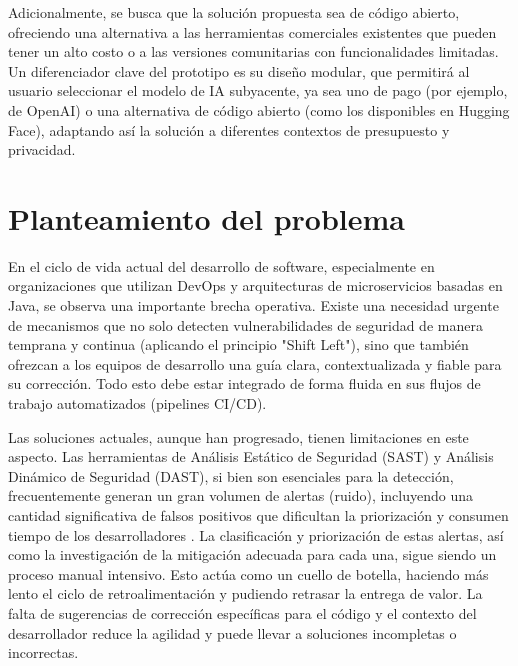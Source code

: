 Adicionalmente, se busca que la solución propuesta sea de código abierto, ofreciendo una alternativa a las herramientas comerciales existentes que pueden tener un alto costo \cite{ghas_docs, sonarqube_editions} o a las versiones comunitarias con funcionalidades limitadas. Un diferenciador clave del prototipo es su diseño modular, que permitirá al usuario seleccionar el modelo de IA subyacente, ya sea uno de pago (por ejemplo, de OpenAI) o una alternativa de código abierto (como los disponibles en Hugging Face), adaptando así la solución a diferentes contextos de presupuesto y privacidad.

\section{Planteamiento del problema}\label{sec:planteamiento_problema}
En el ciclo de vida actual del desarrollo de software, especialmente en organizaciones que utilizan DevOps y arquitecturas de microservicios basadas en Java, se observa una importante brecha operativa. Existe una necesidad urgente de mecanismos que no solo detecten vulnerabilidades de seguridad de manera temprana y continua (aplicando el principio "Shift Left"), sino que también ofrezcan a los equipos de desarrollo una guía clara, contextualizada y fiable para su corrección. Todo esto debe estar integrado de forma fluida en sus flujos de trabajo automatizados (pipelines CI/CD).

Las soluciones actuales, aunque han progresado, tienen limitaciones en este aspecto. Las herramientas de Análisis Estático de Seguridad (SAST) y Análisis Dinámico de Seguridad (DAST), si bien son esenciales para la detección, frecuentemente generan un gran volumen de alertas (ruido), incluyendo una cantidad significativa de falsos positivos que dificultan la priorización y consumen tiempo de los desarrolladores \cite{11}. La clasificación y priorización de estas alertas, así como la investigación de la mitigación adecuada para cada una, sigue siendo un proceso manual intensivo. Esto actúa como un cuello de botella, haciendo más lento el ciclo de retroalimentación y pudiendo retrasar la entrega de valor. La falta de sugerencias de corrección específicas para el código y el contexto del desarrollador reduce la agilidad y puede llevar a soluciones incompletas o incorrectas.

